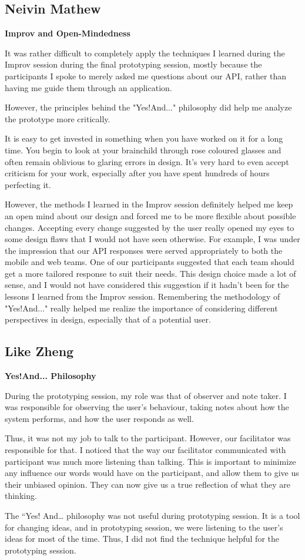 \documentclass[12pt,letterpaper]{article}
\begin{document}
\subsection{Neivin Mathew}
\textbf{Improv and Open-Mindedness}\par
It was rather difficult to completely apply the techniques I learned during the Improv session during the final prototyping session, mostly because the participants I spoke to merely asked me questions about our API, rather than having me guide them through an application.\par
However, the principles behind the "Yes!And..." philosophy did help me analyze the prototype more critically.\par 
It is easy to get invested in something when you have worked on it for a long time. You begin to look at your brainchild through rose coloured glasses and often remain oblivious to glaring errors in design. It's very hard to even accept criticism for your work, especially after you have spent hundreds of hours perfecting it. \par
However, the methods I learned in the Improv session definitely helped me keep an open mind about our design and forced me to be more flexible about possible changes. Accepting every change suggested by the user really opened my eyes to some design flaws that I would not have seen otherwise. For example, I was under the impression that our API responses were served appropriately to both the mobile and web teams. One of our participants suggested that each team should get a more tailored response to suit their needs. This design choice made a lot of sense, and I would not have considered this suggestion if it hadn't been for the lessons I learned from the Improv session. Remembering the methodology of "Yes!And..." really helped me realize the importance of considering different perspectives in design, especially that of a potential user. 

		
	
\clearpage
\subsection{Like Zheng}
\textbf{Yes!And... Philosophy}\par
During the prototyping session, my role was that of observer and note taker. I was responsible for observing the user's behaviour, taking notes about how the system performs, and how the user responds as well.\par
Thus, it was not my job to talk to the participant. However, our facilitator was responsible for that. I noticed that the way our facilitator communicated with participant was much more listening than talking. This is important to minimize any influence our words would have on the participant, and allow them to give us their unbiased opinion. They can now give us a true reflection of what they are thinking.\par 
The “Yes! And… philosophy was not useful during prototyping session. It is a tool for changing ideas, and in prototyping session, we were listening to the user's ideas for most of the time. Thus, I did not find the technique helpful for the prototyping session. 
\end{document}
